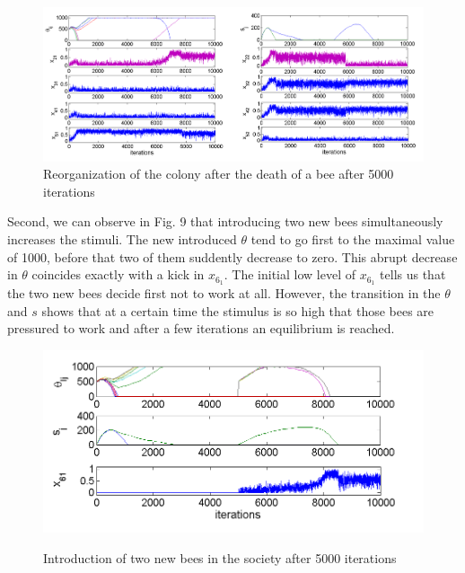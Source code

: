 \begin{figure}
\centerline{\includegraphics[scale=0.42]{figures/Figure4}}
\label{fig:figure6}
\caption{Reorganization of the colony after the death of a bee after 5000 iterations}
\end{figure}


Second, we can observe in Fig. 9 that introducing two new bees
simultaneously increases the stimuli. The new introduced $\theta$ tend to go first to the maximal value of 1000, before that two of them suddently decrease to zero. This abrupt decrease in $\theta$ coincides exactly with a kick in $x_6_1$. The initial low level of $x_6_1$ tells us that the two new bees decide first not to work at all. However, the transition in the $\theta$ and $s$ shows that at a certain time the stimulus is so high that those bees are pressured to work and after a few iterations an equilibrium is reached. 


\begin{figure}[ht!]
\begin{centering}
\includegraphics[scale=0.8]{figures/Figure5}
\label{fig:figure7}
\par\end{centering}

\centering{}\caption{Introduction of two new bees in the society after 5000 iterations}
\end{figure}


